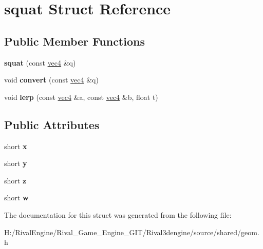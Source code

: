 \hypertarget{structsquat}{}\section{squat Struct Reference}
\label{structsquat}
\subsection*{Public Member Functions}
\begin{DoxyCompactItemize}
\item 
\mbox{\label{structsquat_aa5af9cb6fa333e58adad0b298895ca0c}} 
{\bfseries squat} (const \hyperlink{structvec4}{vec4} \&q)
\item 
\mbox{\label{structsquat_a257b9c9d7c1f98ec90b09c7bb8792bc1}} 
void {\bfseries convert} (const \hyperlink{structvec4}{vec4} \&q)
\item 
\mbox{\label{structsquat_abb87046683611ee82f5bab07ac771df4}} 
void {\bfseries lerp} (const \hyperlink{structvec4}{vec4} \&a, const \hyperlink{structvec4}{vec4} \&b, float t)
\end{DoxyCompactItemize}
\subsection*{Public Attributes}
\begin{DoxyCompactItemize}
\item 
\mbox{\label{structsquat_a380a62234fe0f6976c2307db8790b8f0}} 
short {\bfseries x}
\item 
\mbox{\label{structsquat_a55a1ea4119ab0b743ebf287964be2548}} 
short {\bfseries y}
\item 
\mbox{\label{structsquat_a1ed1a84939ff20af970b31c8497b143c}} 
short {\bfseries z}
\item 
\mbox{\label{structsquat_a169da40d9396d7477949eff599dde99e}} 
short {\bfseries w}
\end{DoxyCompactItemize}


The documentation for this struct was generated from the following file\+:\begin{DoxyCompactItemize}
\item 
H\+:/\+Rival\+Engine/\+Rival\+\_\+\+Game\+\_\+\+Engine\+\_\+\+G\+I\+T/\+Rival3dengine/source/shared/geom.\+h\end{DoxyCompactItemize}
